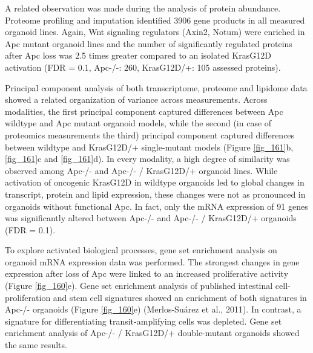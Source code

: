 \begin{flushleft}
A related observation was made during the analysis of protein abundance. Proteome profiling and imputation identified 3906 gene products in all measured organoid lines. Again, Wnt signaling regulators (Axin2, Notum) were enriched in Apc mutant organoid lines and the number of significantly regulated proteins after Apc loss was 2.5 times greater compared to an isolated KrasG12D activation (FDR = 0.1, Apc-/-: 260, KrasG12D/+: 105 assessed proteins). 

Principal component analysis of both transcriptome, proteome and lipidome data showed a related organization of variance across measurements. Across modalities, the first principal component captured differences between Apc wildtype and Apc mutant organoid models, while the second (in case of proteomics measurements the third) principal component captured differences between wildtype and KrasG12D/+ single-mutant models (Figure \ref{fig_161}b, \ref{fig_161}c and \ref{fig_161}d). In every modality, a high degree of similarity was observed among Apc-/- and Apc-/- / KrasG12D/+ organoid lines. While activation of oncogenic KrasG12D in wildtype organoids led to global changes in transcript, protein and lipid expression, these changes were not as pronounced in organoids without functional Apc. In fact, only the mRNA expression of 91 genes was significantly altered between Apc-/- and Apc-/- / KrasG12D/+ organoids (FDR = 0.1). 

To explore activated biological processes, gene set enrichment analysis on organoid mRNA expression data was performed. The strongest changes in gene expression after loss of Apc were linked to an increased proliferative activity (Figure \ref{fig_160}e). Gene set enrichment analysis of published intestinal cell-proliferation and stem cell signatures showed an enrichment of both signatures in Apc-/- organoids (Figure \ref{fig_160}e) (Merlos-Suárez et al., 2011). In contrast, a signature for differentiating transit-amplifying cells was depleted. Gene set enrichment analysis of Apc-/- / KrasG12D/+ double-mutant organoids showed the same results. 


\end{flushleft}
